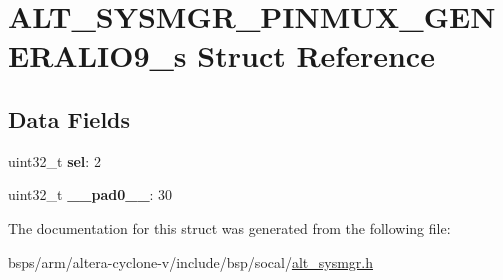 \hypertarget{structALT__SYSMGR__PINMUX__GENERALIO9__s}{}\section{A\+L\+T\+\_\+\+S\+Y\+S\+M\+G\+R\+\_\+\+P\+I\+N\+M\+U\+X\+\_\+\+G\+E\+N\+E\+R\+A\+L\+I\+O9\+\_\+s Struct Reference}
\label{structALT__SYSMGR__PINMUX__GENERALIO9__s}
\subsection*{Data Fields}
\begin{DoxyCompactItemize}
\item 
\mbox{\label{structALT__SYSMGR__PINMUX__GENERALIO9__s_a83e3f39af76993a0fa4d7cbe03d5abca}} 
uint32\+\_\+t {\bfseries sel}\+: 2
\item 
\mbox{\label{structALT__SYSMGR__PINMUX__GENERALIO9__s_ad75be9aadf5041cb37f12419ace81c93}} 
uint32\+\_\+t {\bfseries \+\_\+\+\_\+pad0\+\_\+\+\_\+}\+: 30
\end{DoxyCompactItemize}


The documentation for this struct was generated from the following file\+:\begin{DoxyCompactItemize}
\item 
bsps/arm/altera-\/cyclone-\/v/include/bsp/socal/\mbox{\hyperlink{alt__sysmgr_8h}{alt\+\_\+sysmgr.\+h}}\end{DoxyCompactItemize}
